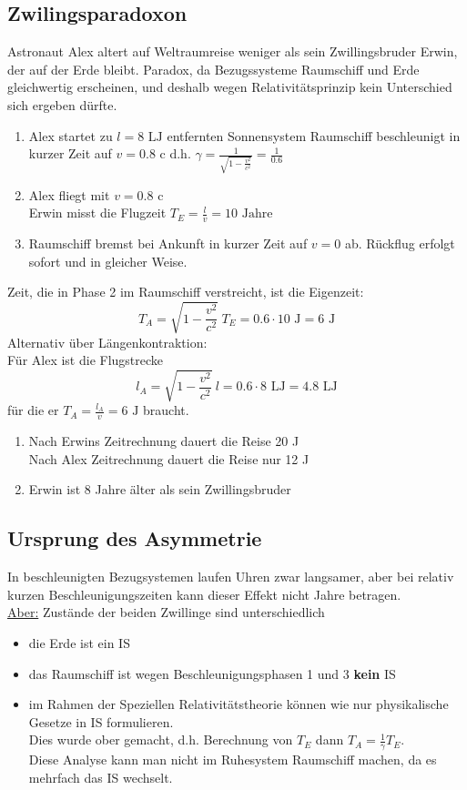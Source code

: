 \documentclass[titlepage,12pt,a4paper,ngerman]{report}
\newcommand{\tx}[1]{\textrm{#1}}
\begin{document}
{\subsection{Zwilingsparadoxon}
Astronaut Alex altert auf Weltraumreise weniger als sein Zwillingsbruder Erwin, der auf der Erde bleibt. Paradox, da Bezugssysteme Raumschiff und Erde gleichwertig erscheinen, und deshalb wegen Relativitätsprinzip kein Unterschied sich ergeben dürfte.
\begin{enumerate}[1)]
	\item Alex startet zu $ l=8 \tx{ LJ} $ entfernten Sonnensystem Raumschiff beschleunigt in kurzer Zeit auf $ v = 0.8 \tx{ c} $ d.h. $ \gamma = \frac{1}{\sqrt{1 - \frac{v^2}{c^2}}} = \frac{1}{0.6} $
	\item Alex fliegt mit $ v = 0.8 \tx{ c} $\\
	Erwin misst die Flugzeit  $ T_E = \frac{l}{v} = 10 \tx{ Jahre} $
	\item Raumschiff bremst bei Ankunft in kurzer Zeit auf $ v = 0 $ ab. Rückflug erfolgt sofort und in gleicher Weise.
\end{enumerate}
Zeit, die in Phase 2 im Raumschiff verstreicht, ist die Eigenzeit:
$$T_A = \sqrt{1-\frac{v^2}{c^2}}\  T_E = 0.6 \cdot 10 \tx{ J} = 6 \tx{ J}$$
Alternativ über Längenkontraktion:\\
Für Alex ist die Flugstrecke
$$l_A = \sqrt{1-\frac{v^2}{c^2}}\  l = 0.6 \cdot 8 \tx{ LJ} = 4.8 \tx{ LJ}$$
für die er $ T_A = \frac{l_A}{v} = 6 \tx{ J} $ braucht.
\begin{enumerate}[$ \rightarrow $]
	\item Nach Erwins Zeitrechnung dauert die Reise 20 J\\
	Nach Alex Zeitrechnung dauert die Reise nur 12 J
	\item Erwin ist 8 Jahre älter als sein Zwillingsbruder
\end{enumerate}
\subsection{Ursprung des Asymmetrie}
In beschleunigten Bezugsystemen laufen Uhren zwar langsamer, aber bei relativ kurzen Beschleunigungszeiten kann dieser Effekt nicht Jahre betragen.\\[5pt]
\underline{Aber:} Zustände der beiden Zwillinge sind unterschiedlich
\begin{itemize}
	\item die Erde ist ein IS
	\item das Raumschiff ist wegen Beschleunigungsphasen 1 und 3 \textbf{kein} IS
	\item im Rahmen der Speziellen Relativitätstheorie können wie nur physikalische Gesetze in IS formulieren. \\
	Dies wurde ober gemacht, d.h. Berechnung von $ T_E $ dann $ T_A = \frac{1}{\gamma} T_E $.\\
	Diese Analyse kann man nicht im Ruhesystem Raumschiff machen, da es mehrfach das IS wechselt.
\end{itemize}
}
\end{document}
